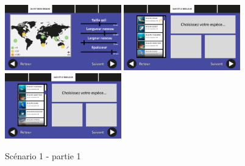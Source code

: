 \documentclass{article}
\begin{document}
\begin{figure}[!h]
	\hfill
	\includegraphics[width=0.45\textwidth]{assets/prototype/haute/Diapositive6}
	\includegraphics[width=0.45\textwidth]{assets/prototype/haute/Diapositive7}
	\hfill
	\includegraphics[width=0.45\textwidth]{assets/prototype/haute/Diapositive8}
	\caption{Scénario 1 - partie 1}
	\label{Scenario 1 - partie 1}
\end{figure}
\end{document}
